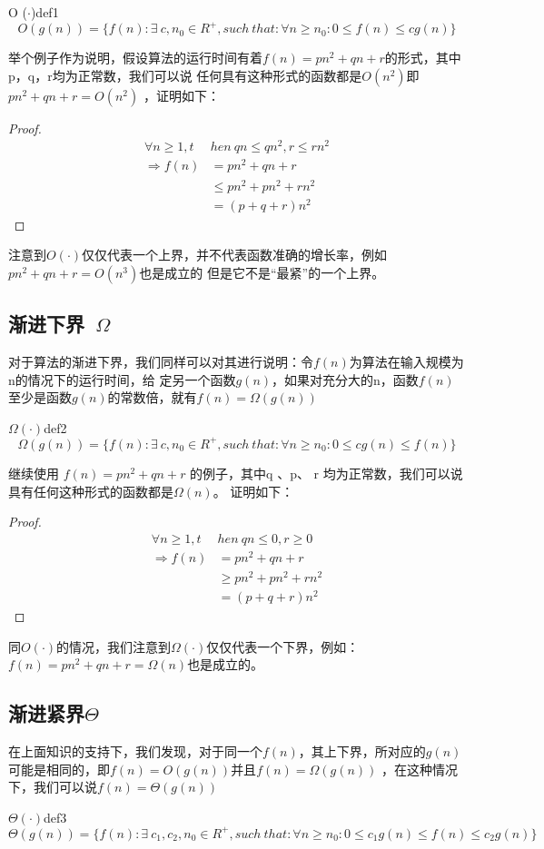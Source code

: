 \begin{definition}{O ($\cdot$)}{def1}   
   \[    
   O(g(n))= \{f(n): \exists\ c,n_0\in R^+,such\ that: \forall n\ge n_0:0\le f(n)\le cg(n)\} 
   \]
\end{definition}
   

举个例子作为说明，假设算法的运行时间有着$f(n)=pn^2+qn+r$的形式，其中p，q，r均为正常数，我们可以说
任何具有这种形式的函数都是$O(n^2)$即$pn^2+qn+r=O(n^2)$ ，证明如下：
\begin{proof}
   \begin{align*}
      \forall n \geq 1,t&hen\ qn\leq qn^2,r\leq rn^2 \\
      \Longrightarrow   f(n)&=pn^2+qn+r \\
      &\leq pn^2+pn^2+rn^2\\
      &=(p+q+r)n^2
   \end{align*}
\end{proof}
注意到$O(\cdot)$仅仅代表一个上界，并不代表函数准确的增长率，例如$pn^2+qn+r=O(n^3)$也是成立的
但是它不是“最紧”的一个上界。
\subsection{渐进下界\ $\Omega$}
对于算法的渐进下界，我们同样可以对其进行说明：令$f(n)$为算法在输入规模为n的情况下的运行时间，给
定另一个函数$g(n)$，如果对充分大的n，函数$f(n)$至少是函数$g(n)$的常数倍，就有$f(n)=\Omega(g(n))$
\begin{definition}{$\Omega(\cdot)$}{def2}
\[
   \Omega (g(n))= \{f(n): \exists\ c,n_0\in R^+,such\ that: \forall n\ge n_0:0\le cg(n)\le f(n)\}
\]
\end{definition}

继续使用 $f(n)=pn^2+qn+r$ 的例子，其中q 、p、 r 均为正常数，我们可以说具有任何这种形式的函数都是$\Omega(n)$。
证明如下：
\begin{proof}
   \begin{align*}
      \forall n \geq 1,t&hen\ qn\leq 0,r\geq 0 \\
      \Longrightarrow   f(n)&=pn^2+qn+r \\
      &\geq pn^2+pn^2+rn^2\\
      &=(p+q+r)n^2
   \end{align*}
\end{proof}

同$O(\cdot)$的情况，我们注意到$\Omega(\cdot)$仅仅代表一个下界，例如：$f(n)=pn^2+qn+r=\Omega(n)$也是成立的。

\subsection{渐进紧界$\Theta$}
在上面知识的支持下，我们发现，对于同一个$f(n)$，其上下界，所对应的$g(n)$可能是相同的，即$f(n)=O(g(n))$并且$f(n)=\Omega(g(n))$
，在这种情况下，我们可以说$f(n)=\Theta(g(n))$
\begin{definition}{$\Theta(\cdot)$}{def3}
   \[
      \Theta(g(n)) = \{f(n): \exists\ c_1,c_2,n_0\in R^+,such\ that: \forall n\ge n_0:0\le c_1 g(n)\le f(n)\le c_2 g(n)\}
   \]
\end{definition}

